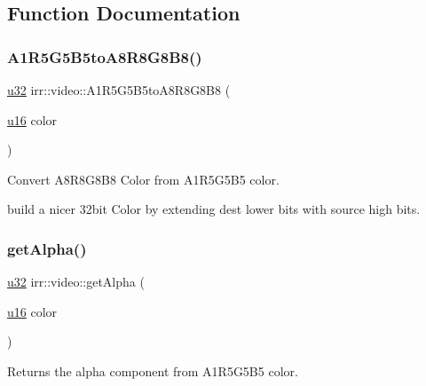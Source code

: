\subsection{Function Documentation}
\mbox{\label{namespaceirr_1_1video_a8aa9e69faa25064379df5a91273b9fbe}} 
\subsubsection{\texorpdfstring{A1\+R5\+G5\+B5to\+A8\+R8\+G8\+B8()}{A1R5G5B5toA8R8G8B8()}}
{\footnotesize\ttfamily \hyperlink{namespaceirr_a0416a53257075833e7002efd0a18e804}{u32} irr\+::video\+::\+A1\+R5\+G5\+B5to\+A8\+R8\+G8\+B8 (\begin{DoxyParamCaption}\item[{\hyperlink{namespaceirr_ae9f8ec82692ad3b83c21f555bfa70bcc}{u16}}]{color }\end{DoxyParamCaption})\hspace{0.3cm}{\ttfamily [inline]}}



Convert A8\+R8\+G8\+B8 Color from A1\+R5\+G5\+B5 color. 

build a nicer 32bit Color by extending dest lower bits with source high bits. \mbox{\label{namespaceirr_1_1video_a23358b142a005c4a4c747d227a4d77ab}} 
\subsubsection{\texorpdfstring{get\+Alpha()}{getAlpha()}}
{\footnotesize\ttfamily \hyperlink{namespaceirr_a0416a53257075833e7002efd0a18e804}{u32} irr\+::video\+::get\+Alpha (\begin{DoxyParamCaption}\item[{\hyperlink{namespaceirr_ae9f8ec82692ad3b83c21f555bfa70bcc}{u16}}]{color }\end{DoxyParamCaption})\hspace{0.3cm}{\ttfamily [inline]}}



Returns the alpha component from A1\+R5\+G5\+B5 color. 


